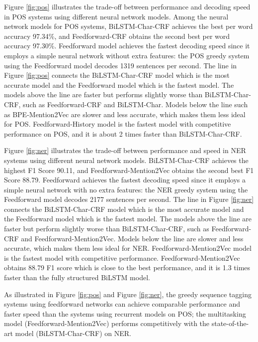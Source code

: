 \documentclass{sfuthesis}
\begin{document}
Figure \ref{fig:pos} illustrates the trade-off between performance and decoding speed in POS systems using different neural network models. Among the neural network models for POS systems, BiLSTM-Char-CRF achieves the best per word accuracy 97.34\%, and Feedforward-CRF obtains the second best per word accuracy 97.30\%. Feedforward model achieves the fastest decoding speed since it employs a simple neural network without extra features: the POS greedy system using the Feedforward model decodes 1319 sentences per second. The line in Figure \ref{fig:pos} connects the BiLSTM-Char-CRF model which is the most accurate model and the Feedforward model which is the fastest model. The models above the line are faster but performs slightly worse than BiLSTM-Char-CRF, such as Feedforward-CRF and BiLSTM-Char. Models below the line such as BPE-Mention2Vec are slower and less accurate, which makes them less ideal for POS. Feedforward-History model is the fastest model with competitive performance on POS, and it is about 2 times faster than BiLSTM-Char-CRF.

Figure \ref{fig:ner} illustrates the trade-off between performance and speed in NER systems using different neural network models. BiLSTM-Char-CRF achieves the highest F1 Score 90.11, and Feedforward-Mention2Vec obtains the second best F1 Score 88.79. Feedforward achieves the fastest decoding speed since it employs a simple neural network with no extra features: the NER greedy system using the Feedforward model decodes 2177 sentences per second. The line in Figure \ref{fig:ner} connects the BiLSTM-Char-CRF model which is the most accurate model and the Feedforward model which is the fastest model. The models above the line are faster but perform slightly worse than BiLSTM-Char-CRF, such as Feedforward-CRF and Feedforward-Mention2Vec. Models below the line are slower and less accurate, which makes them less ideal for NER. Feedforward-Mention2Vec model is the fastest model with competitive performance. Feedforward-Mention2Vec obtains 88.79 F1 score which is close to the best performance, and it is 1.3 times faster than the fully structured BiLSTM model.

As illustrated in Figure \ref{fig:pos} and Figure \ref{fig:ner}, the greedy sequence tagging systems using feedforward networks can achieve comparable performance and faster speed than the systems using recurrent models on POS; the multitasking model (Feedforward-Mention2Vec) performs competitively with the state-of-the-art model (BiLSTM-Char-CRF) on NER.
\end{document}
